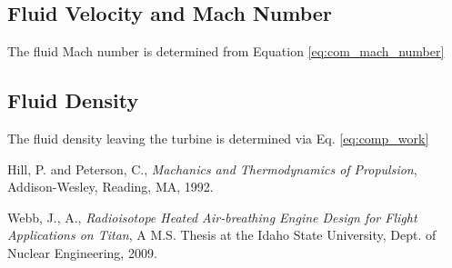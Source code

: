 \subsection{Fluid Velocity and Mach Number}
The fluid Mach number is determined from Equation \ref{eq:com_mach_number}

\subsection{Fluid Density}
The fluid density leaving the turbine is determined via Eq. \ref{eq:comp_work}

\begin{thebibliography}{2}

 Hill, P. and Peterson, C., \emph{Machanics and Thermodynamics of Propulsion}, Addison-Wesley, Reading, MA, 1992.

 Webb, J., A., \emph{Radioisotope Heated Air-breathing Engine Design for Flight Applications on Titan}, A M.S. Thesis at
                         the Idaho State University, Dept. of Nuclear Engineering, 2009.
\end{thebibliography}